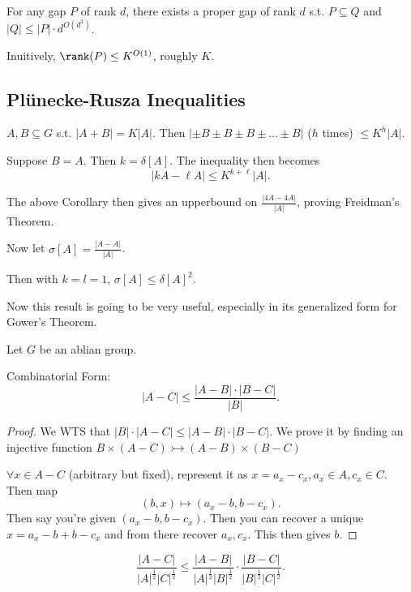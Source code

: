 \documentclass[a4paper]{article}
\begin{document}
\begin{thm}
	For any gap $P $ of rank $d $, there exists a proper gap of rank $d $ s.t. $P \subseteq Q $ and $|Q| \le |P|\cdot d^{O(d^3)}  $.
\end{thm}

Inuitively, $\rank(P) \le K^{O(1)}$, roughly $K $.

\subsection{Pl\"unecke-Rusza Inequalities}

\begin{thm}\label{thm:plunecke}
	$A,B \subseteq G $ s.t. $|A+B| = K |A| $.
	Then $|\pm B \pm B \pm B \pm \ldots \pm B |$ ($h $ times) $\le K^{h}|A|  $.
\end{thm}

\begin{cor}
	Suppose $B = A $.
	Then $k = \delta[A] $.
	The inequality then becomes
	\[
		|kA -\ell A| \le K^{k+\ell}|A|
	.\]
\end{cor}

The above Corollary then gives an upperbound on $\frac{|4A-4A|}{|A|} $, proving Freidman's Theorem.

Now let $\sigma[A] = \frac{|A-A|}{|A|} $.

\begin{cor}
	Then with $k = l = 1 $, $\sigma[A] \le \delta[A]^2$.
\end{cor}

Now this result is going to be very useful, especially in its generalized form for Gower's Theorem.

\begin{lem}
	Let $G $ be an ablian group.

	Combinatorial Form:
	\[
		|A-C| \le \frac{|A-B|\cdot |B-C|}{|B|}
	.\]
\end{lem}
\begin{proof}
	We WTS that $|B|\cdot |A-C| \le |A-B| \cdot |B-C| $.
	We prove it by finding an injective function $B\times (A-C) \rightarrowtail (A-B) \times (B-C) $

	$\forall x \in A - C $ (arbitrary but fixed), represent it as $x=a_x-c_x, a_x \in A, c_x \in C$.
	Then map
	\[
		(b,x) \mapsto (a_x-b,b-c_x)
	.\]
	Then say you're given $(a_x-b,b-c_x) $.
	Then you can recover a unique $x = a_x-b+b-c_x $ and from there recover $a_x,c_x $.
	This then gives $b $.
\end{proof}
\begin{lem}
	\[
		\frac{|A-C|}{|A|^{\frac{1}{2}}|C|^{\frac{1}{2}} } \le \frac{|A-B|}{|A|^{\frac{1}{2}}|B|^{\frac{1}{2}}  } \cdot \frac{|B-C|}{|B|^{\frac{1}{2}}|C|^{\frac{1}{2}}  }
	.\]
\end{lem}
\end{document}
